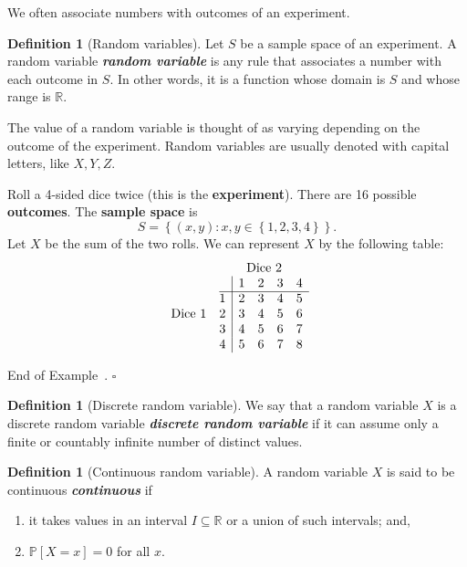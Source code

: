 \documentclass[10pt]{article}
\theoremstyle{definition}
\newtheorem{definition}[theorem]{Definition}
\newtheorem{example}[theorem]{Example}
\renewenvironment{example}
{\begin{oldexample}}
  {\par\smallskip\hfill   End of Example~\theexample. $\square$    \par\end{oldexample}}
\newcommand{\1}[1]{\textbf{1}_{\left[#1\right]}} %
\def\R{\mathbb{R}} %
\def\P{\mathbb{P}} %
\DeclareRobustCommand{\demph}[1]{%
  \ifmmode
  {\color{Blue}#1}%
  \else
  {\color{Blue}\bfseries\slshape #1}%
  \fi
}
\begin{document}
We often associate numbers with outcomes of an experiment.

\begin{definition}[Random variables]
  \label{def:random-variables}
  Let $S$ be a sample space of an experiment. A \demph{random variable} is any
  rule that associates a number with each outcome in $S$. In other words, it
  is a function whose domain is $S$ and whose range is $\R$.
\end{definition}

The value of a random variable is thought of as varying depending on the
outcome of the experiment. Random variables are usually denoted with capital
letters, like $X,Y,Z$.

\begin{example}
  \label{ex:sum-2d4}
  Roll a 4-sided dice twice (this is the \textbf{experiment}). There are 16
  possible \textbf{outcomes}. The \textbf{sample space} is
  \begin{equation*}
    S = \left\{(x,y): x,y\in \left\{1,2,3,4\right\} \right\}.
  \end{equation*}
  Let $X$ be the sum of the two rolls. We can represent $X$ by the following
  table:
  \begin{equation*}
    \begin{array}{c@{\quad}c|cccc} & \multicolumn{5}{c}{\text{Dice 2}} \\ & &
      1 & 2 & 3 & 4 \\ \cline{2-6}  & 1 & 2 & 3 & 4 & 5 \\ \text{Dice 1} & 2 & 3 & 4 & 5 & 6 \\ & 3 & 4 & 5 & 6 & 7 \\ & 4 & 5 & 6 & 7 & 8 \end{array}
  \end{equation*}
\end{example}

\begin{definition}[Discrete random variable]
  \label{def:discrete-random-variable}
  We say that a random variable $X$ is a \demph{discrete random variable} if
  it can assume only a finite or countably infinite number of distinct values.
\end{definition}

\begin{definition}[Continuous random variable]
  \label{def:continuous-random-variable}
  A random variable $X$ is said to be \demph{continuous} if
  \begin{enumerate}[label=(\roman*)]
    \item  it takes values in an interval $I\subseteq \R$ or a union of such
    intervals; and,
    \item $\P\left[X = x \right] = 0$ for all $x$.
  \end{enumerate}
\end{definition}
\end{document}
